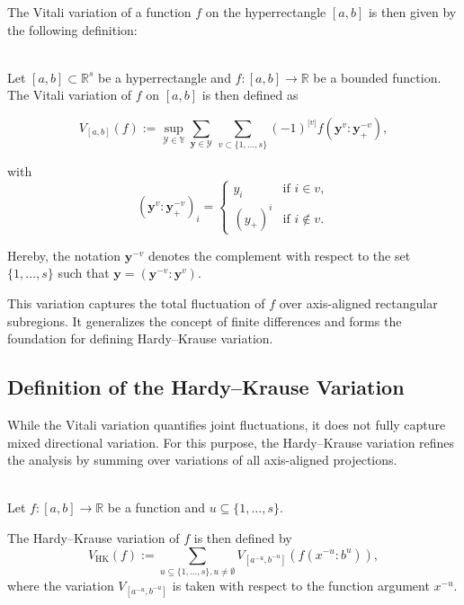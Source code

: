 The Vitali variation of a function $f$ on the hyperrectangle $[a,b]$ is then
given by the following definition:

\begin{definition} \ \\
Let $[a,b] \subset \mathbb{R}^s$ be a hyperrectangle and $f \colon [a,b] \to \mathbb{R}$ be a bounded function. The Vitali variation of $f$ on $[a,b]$ is then defined as

\begin{equation*}
    V_{[a,b]}(f) := \sup\limits_{\mathcal{Y} \in \mathbb{Y}} \sum_{\mathbf{y} \in \mathcal{Y}}\, \sum_{v \subset \{1,\dots,s\}} (-1)^{|v|} f(\mathbf{y}^v : \mathbf{y}^{-v}_+),
\end{equation*}

with
\begin{equation*}
  (\mathbf{y}^v : \mathbf{y}^{-v}_+)_i = \begin{cases}
    y_i & \text{if } i \in v, \\
    (y_+)^i & \text{if } i \notin v.
  \end{cases}
\end{equation*}

\end{definition}

Hereby, the notation $\mathbf{y}^{-v}$ denotes the complement with respect to
the set $\{1,\dots,s\}$ such that
$\mathbf{y}=(\mathbf{y}^{-v}\colon\mathbf{y}^{v})$.

This variation captures the total fluctuation of $f$ over axis-aligned
rectangular subregions. It generalizes the concept of finite differences and
forms the foundation for defining Hardy--Krause variation.


  \subsection{Definition of the Hardy--Krause Variation}
  \label{sec:hk-variation}

While the Vitali variation quantifies joint fluctuations, it does not fully capture mixed directional variation. For this purpose, the Hardy--Krause variation refines the analysis by summing over variations of all axis-aligned projections.

\begin{definition} \ \\
\label{def:hk-variation}
Let $f \colon [a,b] \to \mathbb{R}$ be a function and $u \subseteq \{1,\dots,s\}$.

The Hardy--Krause variation of $f$ is then defined by
\begin{equation*}
  V_{\mathrm{HK}}(f) := \sum_{u \subseteq \{1,\dots,s\}, u \neq \emptyset} V_
  {[a^{-u}, b^{-u}]}(f(x^{-u}: b^u)),
\end{equation*}
where the variation $V_{[a^{-u}, b^{-u}]}$ is taken with respect to the function
argument $x^{-u}$.
\end{definition}

